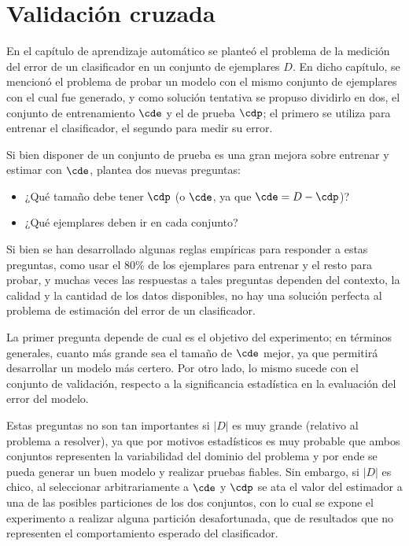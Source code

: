 
\section{Validación cruzada}
  
En el capítulo de aprendizaje automático se planteó el problema de la medición del error de un clasificador en un conjunto de ejemplares $D$. En dicho capítulo, se mencionó el problema de probar un modelo con el mismo conjunto de ejemplares con el cual fue generado, y como solución tentativa se propuso dividirlo en dos, el conjunto de entrenamiento $\cde$ y el de prueba $\cdp$; el primero se utiliza para entrenar el clasificador, el segundo para medir su error.

Si bien disponer de un conjunto de prueba es una gran mejora sobre entrenar y estimar con $\cde$, plantea dos nuevas preguntas:

\begin{itemize}
\item ¿Qué tamaño debe tener $\cdp$ (o $\cde$, ya que $\cde = D - \cdp$)?
\item ¿Qué ejemplares deben ir en cada conjunto? 
\end{itemize}

Si bien se han desarrollado algunas reglas empíricas para responder a estas preguntas, como usar el 80\% de los ejemplares para entrenar y el resto para probar, y muchas veces las respuestas a tales preguntas dependen del contexto, la calidad y la cantidad de los datos disponibles, no hay una solución perfecta al problema de estimación del error de un clasificador.

La primer pregunta depende de cual es el objetivo del experimento; en términos generales, cuanto más grande sea el tamaño de $\cde$ mejor, ya que permitirá desarrollar un modelo más certero. Por otro lado, lo mismo sucede con el conjunto de validación, respecto a la significancia estadística en la evaluación del error del modelo.

Estas preguntas no son tan importantes si $|D|$ es muy grande (relativo al problema a resolver), ya que por motivos estadísticos es muy probable que ambos conjuntos representen la variabilidad del dominio del problema y por ende se pueda generar un buen modelo y realizar pruebas fiables.  Sin embargo, si $|D|$ es chico, al seleccionar arbitrariamente a $\cde$ y $\cdp$ se ata el valor del estimador a una de las posibles particiones de los dos conjuntos, con lo cual se expone el experimento a realizar alguna partición desafortunada, que de resultados que no representen el comportamiento esperado del clasificador.

